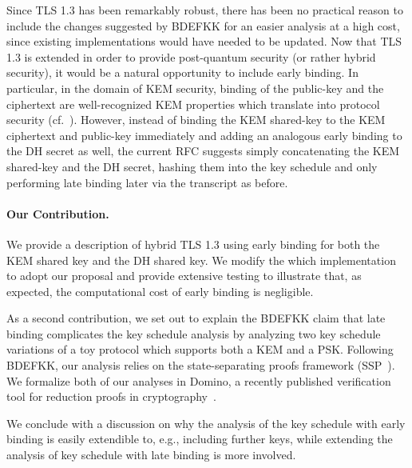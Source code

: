 Since TLS 1.3 has been remarkably robust, there has been no practical reason to include the changes suggested by BDEFKK for an easier analysis at a high cost, since existing implementations would have needed to be updated. Now that TLS 1.3 is extended in order to provide post-quantum security (or rather hybrid security), it would be a natural opportunity to include early binding. In particular, in the domain of KEM security, binding of the public-key and the ciphertext are well-recognized KEM properties which translate into protocol security (cf.~\cite{X}). %
However, instead of binding the KEM shared-key to the KEM ciphertext and public-key immediately and adding an analogous early binding to the DH secret as well, the current RFC suggests simply concatenating the KEM shared-key and the DH secret, hashing them into the key schedule and only performing late binding later via the transcript as before.

\paragraph{Our Contribution.} We provide a description of hybrid TLS 1.3 using early binding for both the KEM shared key and the DH shared key.
We modify the {\color{blue}which} implementation to adopt our proposal and provide extensive testing to illustrate that, as expected, the computational cost of early binding is negligible. 

As a second contribution, we set out to explain the BDEFKK claim that late binding complicates the key schedule analysis by analyzing two key schedule variations of a toy protocol which supports both a KEM and a PSK. Following BDEFKK, our analysis relies on the state-separating proofs framework (SSP~\cite{AC:BDFKK18}). We
formalize both of our analyses in Domino, a recently published verification tool for reduction proofs in cryptography~\cite{EPRINT:BERW26}.

We conclude with a discussion on why the analysis of the key schedule with early binding is easily extendible to, e.g., including further keys, while extending the analysis of key schedule with late binding is more involved.

